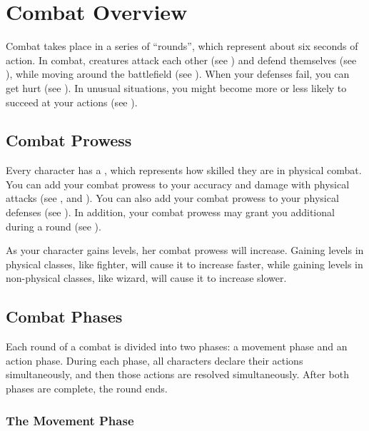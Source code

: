 \section{Combat Overview}\label{Combat Overview}

    Combat takes place in a series of ``rounds'', which represent about six seconds of action.
    In combat, creatures attack each other (see ) and defend themselves (see ), while moving around the battlefield (see ).
    When your defenses fail, you can get hurt (see ).
    In unusual situations, you might become more or less likely to succeed at your actions (see ).

    \subsection{Combat Prowess}\label{Combat Prowess}
        Every character has a , which represents how skilled they are in physical combat.
        You can add your combat prowess to your accuracy and damage with physical attacks (see , and ).
        You can also add your combat prowess to your physical defenses (see ).
        In addition, your combat prowess may grant you additional  during a round (see ).

        As your character gains levels, her combat prowess will increase.
        Gaining levels in physical classes, like fighter, will cause it to increase faster, while gaining levels in non-physical classes, like wizard, will cause it to increase slower.

    \subsection{Combat Phases}

        Each round of a combat is divided into two phases: a movement phase and an action phase.
        During each phase, all characters declare their actions simultaneously, and then those actions are resolved simultaneously.
        After both phases are complete, the round ends.

        \subsubsection{The Movement Phase}\label{The Movement Phase}

